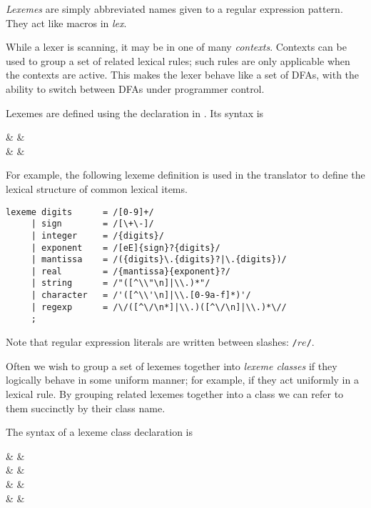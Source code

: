 {\em Lexemes} are simply abbreviated names given to a regular expression
pattern.  They act like macros in {\em lex}.

While a lexer is scanning, it may be in one of many {\em contexts}.
Contexts can be used to group a set of related lexical rules; such rules
are only applicable when the contexts are active.  This makes the
lexer behave like a set of DFAs, with the ability to switch between
DFAs under programmer control.  



Lexemes are defined using the  declaration in \Prop. 
Its syntax is
\begin{syntax}
   & \IS &   \T{;} \\
     & \IS & \Id \T{=}  \\
\end{syntax}

For example, the following lexeme definition is used in the \Prop{}
translator to define the lexical structure of common lexical items.

\begin{verbatim}
lexeme digits      = /[0-9]+/
     | sign        = /[\+\-]/
     | integer     = /{digits}/
     | exponent    = /[eE]{sign}?{digits}/
     | mantissa    = /({digits}\.{digits}?|\.{digits})/
     | real        = /{mantissa}{exponent}?/
     | string      = /"([^\\"\n]|\\.)*"/ 
     | character   = /'([^\\'\n]|\\.[0-9a-f]*)'/
     | regexp      = /\/([^\/\n*]|\\.)([^\/\n]|\\.)*\//
     ;
\end{verbatim}

Note that regular expression literals are written between
slashes: \verb|/|$re$\verb|/|.  


Often we wish to group a set of lexemes together into {\em lexeme classes} if 
they logically behave in some uniform manner; for example, if they
act uniformly in a lexical rule.  By grouping related lexemes together
into a class we can refer to them succinctly by their class name.

The syntax of a lexeme class declaration is

\begin{syntax}
   & \IS &  
        \T{;} \\
   & \IS & \Id \T{=}  \\
   & \IS &  \\
                   & \OR & \Id {} \\
\end{syntax}

